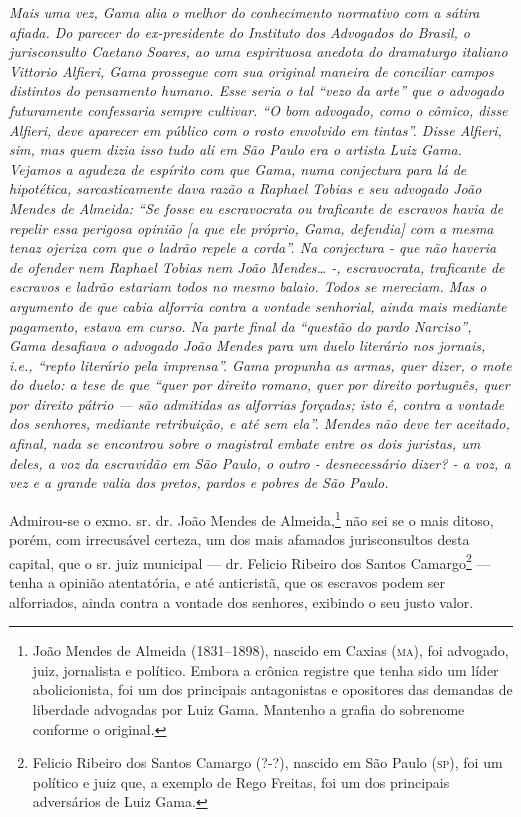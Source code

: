 \begin{didascalia}
\emph{Mais uma vez, Gama alia o melhor do conhecimento normativo com a
sátira afiada. Do parecer do ex-presidente do Instituto dos Advogados do
Brasil, o jurisconsulto Caetano Soares, ao uma espirituosa anedota do
dramaturgo italiano Vittorio Alfieri, Gama prossegue com sua original
maneira de conciliar campos distintos do pensamento humano. Esse seria o
tal ``vezo da arte'' que o advogado futuramente confessaria sempre
cultivar. ``O bom advogado, como o cômico, disse Alfieri, deve aparecer
em público com o rosto envolvido em tintas''. Disse Alfieri, sim, mas
quem dizia isso tudo ali em São Paulo era o artista Luiz Gama. Vejamos a
agudeza de espírito com que Gama, numa conjectura para lá de hipotética,
sarcasticamente dava razão a Raphael Tobias e seu advogado João Mendes
de Almeida: ``Se fosse eu escravocrata ou traficante de escravos havia de
repelir essa perigosa opinião {[}a que ele próprio, Gama, defendia{]}
com a mesma tenaz ojeriza com que o ladrão repele a corda''. Na
conjectura - que não haveria de ofender nem Raphael Tobias nem João
Mendes\ldots{} -, escravocrata, traficante de escravos e ladrão estariam
todos no mesmo balaio. Todos se mereciam. Mas o argumento de que cabia
alforria contra a vontade senhorial, ainda mais mediante pagamento,
estava em curso. Na parte final da ``questão do pardo Narciso'', Gama
desafiava o advogado João Mendes para um duelo literário nos jornais,
i.e., ``repto literário pela imprensa''. Gama propunha as armas, quer
dizer, o mote do duelo: a tese de que ``quer por direito romano, quer por
direito português, quer por direito pátrio --- são admitidas as
alforrias forçadas; isto é, contra a vontade dos senhores, mediante
retribuição, e até sem ela''. Mendes não deve ter aceitado, afinal, nada
se encontrou sobre o magistral embate entre os dois juristas, um deles,
a voz da escravidão em São Paulo, o outro - desnecessário dizer? - a
voz, a vez e a grande valia dos pretos, pardos e pobres de São Paulo.}
\end{didascalia}

Admirou-se o exmo. sr. dr. João Mendes de
Almeida,\footnote{ João Mendes de Almeida
  (1831--1898), nascido em Caxias (\textsc{ma}), foi advogado, juiz, jornalista e
  político. Embora a crônica registre que tenha sido um líder
  abolicionista, foi um dos principais antagonistas e opositores das
  demandas de liberdade advogadas por Luiz Gama. Mantenho a grafia do
  sobrenome conforme o original.} não sei se o mais ditoso, porém, com
irrecusável certeza, um dos mais afamados jurisconsultos desta capital,
que o sr. juiz municipal --- dr. Felicio Ribeiro dos Santos
Camargo\footnote{ Felicio Ribeiro dos Santos Camargo (?-?), nascido
  em São Paulo (\textsc{sp}), foi um político e juiz que, a exemplo de Rego
  Freitas, foi um dos principais adversários de Luiz Gama.} --- tenha a
opinião atentatória, e até anticristã, que os escravos podem ser
alforriados, ainda contra a vontade dos senhores, exibindo o seu justo
valor.

